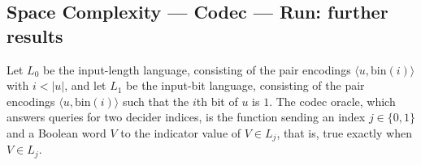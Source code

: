\subsection*{Space Complexity --- Codec --- Run: further results}

\begin{lemma}
\label{Complexity.Codec.orc_eq}
\leanok
{}
Let $L_0$ be the input-length language, consisting of the pair encodings
$\langle u,\mathrm{bin}(i)\rangle$ with $i<|u|$, and let $L_1$ be the input-bit language,
consisting of the pair encodings $\langle u,\mathrm{bin}(i)\rangle$ such that the $i$th bit
of $u$ is $1$. The codec oracle, which answers queries for two decider indices, is the
function sending an index $j\in\{0,1\}$ and a Boolean word $V$ to the indicator value of
$V\in L_j$, that is, true exactly when $V\in L_j$.
\end{lemma}
